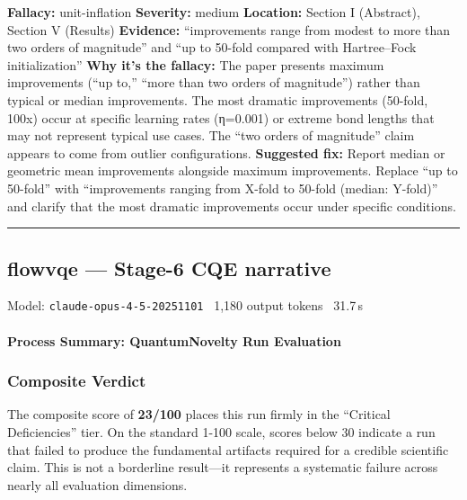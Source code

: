 \documentclass[10pt,letterpaper]{article}
\begin{document}
\textbf{Fallacy:} unit-inflation
\textbf{Severity:} medium
\textbf{Location:} Section I (Abstract), Section V (Results)
\textbf{Evidence:} ``improvements range from modest to more than two orders of magnitude'' and ``up to 50-fold compared with Hartree--Fock initialization''
\textbf{Why it's the fallacy:} The paper presents maximum improvements (``up to,'' ``more than two orders of magnitude'') rather than typical or median improvements. The most dramatic improvements (50-fold, 100x) occur at specific learning rates (η=0.001) or extreme bond lengths that may not represent typical use cases. The ``two orders of magnitude'' claim appears to come from outlier configurations.
\textbf{Suggested fix:} Report median or geometric mean improvements alongside maximum improvements. Replace ``up to 50-fold'' with ``improvements ranging from X-fold to 50-fold (median: Y-fold)'' and clarify that the most dramatic improvements occur under specific conditions.

\begin{center}\rule{0.5\linewidth}{0.5pt}\end{center}


\subsection{flowvqe --- Stage-6 CQE narrative}
\noindent\textcolor{muted}{\small Model: \texttt{claude-opus-4-5-20251101} \textperiodcentered\ 1,180 output tokens \textperiodcentered\ 31.7\,s}

\hypertarget{process-summary-quantumnovelty-run-evaluation}{%
\paragraph{Process Summary: QuantumNovelty Run Evaluation}\label{process-summary-quantumnovelty-run-evaluation}}

\hypertarget{composite-verdict}{%
\subsubsection{Composite Verdict}\label{composite-verdict}}

The composite score of \textbf{23/100} places this run firmly in the ``Critical Deficiencies'' tier. On the standard 1-100 scale, scores below 30 indicate a run that failed to produce the fundamental artifacts required for a credible scientific claim. This is not a borderline result---it represents a systematic failure across nearly all evaluation dimensions.
\end{document}

